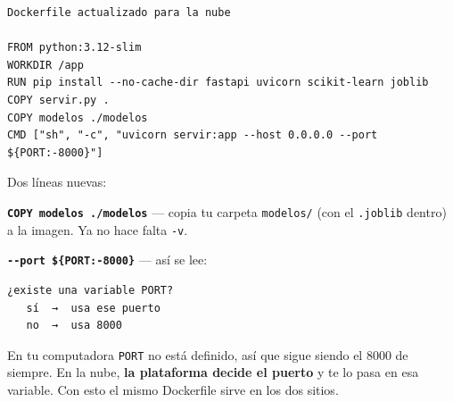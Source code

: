 \documentclass[
]{article}
\newenvironment{Shaded}{}{}
\newcommand{\BuiltInTok}[1]{\textcolor[rgb]{0.00,0.50,0.00}{#1}}
\newcommand{\CharTok}[1]{\textcolor[rgb]{0.25,0.44,0.63}{#1}}
\newcommand{\CommentTok}[1]{\textcolor[rgb]{0.38,0.63,0.69}{\textit{#1}}}
\newcommand{\NormalTok}[1]{#1}
\newcommand{\OperatorTok}[1]{\textcolor[rgb]{0.40,0.40,0.40}{#1}}
\newcommand{\SpecialCharTok}[1]{\textcolor[rgb]{0.25,0.44,0.63}{#1}}
\newcommand{\StringTok}[1]{\textcolor[rgb]{0.25,0.44,0.63}{#1}}
\begin{document}
\protect{}\label{aa25d645}
\begin{Shaded}
\end{Shaded}

\begin{verbatim}
Dockerfile actualizado para la nube

FROM python:3.12-slim
WORKDIR /app
RUN pip install --no-cache-dir fastapi uvicorn scikit-learn joblib
COPY servir.py .
COPY modelos ./modelos
CMD ["sh", "-c", "uvicorn servir:app --host 0.0.0.0 --port ${PORT:-8000}"]
\end{verbatim}

\protect{}\label{5eece350}
Dos líneas nuevas:

\textbf{\texttt{COPY\ modelos\ ./modelos}} --- copia tu carpeta
\texttt{modelos/} (con el \texttt{.joblib} dentro) a la imagen. Ya no
hace falta \texttt{-v}.

\textbf{\texttt{-\/-port\ \$\{PORT:-8000\}}} --- así se lee:

\begin{verbatim}
¿existe una variable PORT?
   sí  →  usa ese puerto
   no  →  usa 8000
\end{verbatim}

En tu computadora \texttt{PORT} no está definido, así que sigue siendo
el 8000 de siempre. En la nube, \textbf{la plataforma decide el puerto}
y te lo pasa en esa variable. Con esto el mismo Dockerfile sirve en los
dos sitios.
\end{document}
